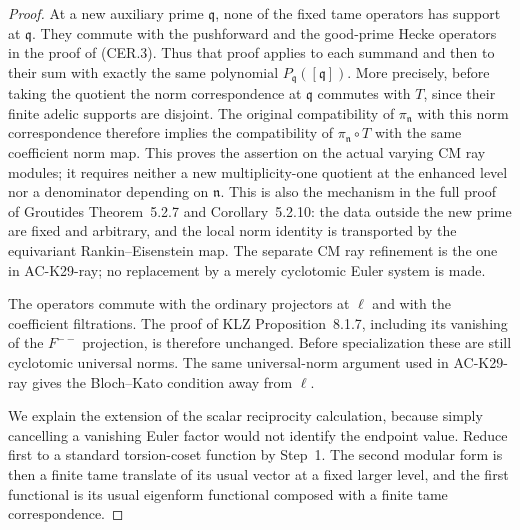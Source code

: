 \begin{proof}
At a new auxiliary prime $\mathfrak q$, none of the
fixed tame operators has support at $\mathfrak q$.
They commute with the pushforward and the good-prime
Hecke operators in the proof of (CER.3).
Thus that proof applies to each summand and
then to their sum with exactly the same polynomial
$P_{\mathfrak q}([\mathfrak q])$.
More precisely, before taking the quotient the
norm correspondence at $\mathfrak q$ commutes
with $T$, since their finite adelic supports are
disjoint.  The original compatibility of
$\pi_{\mathfrak n}$ with this norm correspondence
therefore implies the compatibility of
$\pi_{\mathfrak n}\circ T$ with the same
coefficient norm map.  This proves the assertion
on the actual varying CM ray modules; it requires
neither a new multiplicity-one quotient at the
enhanced level nor a denominator depending on
$\mathfrak n$.
This is also the mechanism in the full proof of
Groutides Theorem~5.2.7 and Corollary~5.2.10:
the data outside the new prime are fixed and arbitrary,
and the local norm identity is transported by the
equivariant Rankin--Eisenstein map.
The separate CM ray refinement is the one in
AC-K29-ray; no replacement by a merely cyclotomic
Euler system is made.

The operators commute with the ordinary projectors at
$\ell$ and with the coefficient filtrations.
The proof of KLZ Proposition~8.1.7, including its
vanishing of the $F^{--}$ projection, is therefore
unchanged.  Before specialization these are still
cyclotomic universal norms.  The same universal-norm
argument used in AC-K29-ray gives the Bloch--Kato
condition away from $\ell$.

We explain the extension of the scalar reciprocity
calculation, because simply cancelling a vanishing
Euler factor would not identify the endpoint value.
Reduce first to a standard torsion-coset function by
Step~1.  The second modular form is then a finite tame
translate of its usual vector at a fixed larger level,
and the first functional is its usual eigenform
functional composed with a finite tame correspondence.


\end{proof}
